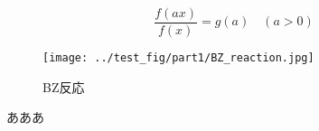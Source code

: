 \documentclass[autodetect-engine,dvipdfmx-if-dvi,a4paper,ja=standard]{bxjsbook}
\begin{document}
\begin{equation}
  \frac{f(ax)}{f(x)}=g(a) \quad (a>0)
\end{equation}
\begin{figure}[htbp]
  \centering
  \texttt{[image: ../test\_fig/part1/BZ\_reaction.jpg]}
  \caption{BZ反応}
\end{figure}
あああ\cite{BZ_reaction}\cite{eckert1998square}\cite{kondo1995reaction}\cite{koschmieder1993benard}\cite{mukouyama2002sensory}\cite{oniciu1991some}\cite{schilardi1998evolution}\cite{witten1981diffusion}\cite{めっき添加剤の作用機構と表面形状制御}\cite{表面粗さ曲線のフラクタル解析}\cite{matsushita1984fractal}\cite{test_ref}
% 
% 
\end{document}
